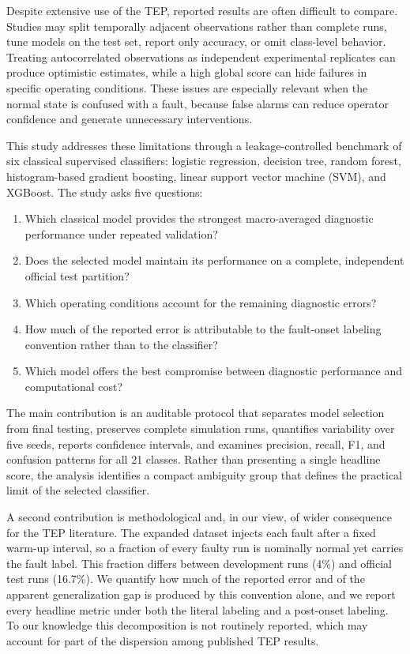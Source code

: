 \documentclass[12pt,a4paper]{article}
\begin{document}
Despite extensive use of the TEP, reported results are often difficult to
compare. Studies may split temporally adjacent observations rather than complete
runs, tune models on the test set, report only accuracy, or omit class-level
behavior. Treating autocorrelated observations as independent experimental
replicates can produce optimistic estimates, while a high global score can hide
failures in specific operating conditions. These issues are especially relevant
when the normal state is confused with a fault, because false alarms can reduce
operator confidence and generate unnecessary interventions.

This study addresses these limitations through a leakage-controlled benchmark
of six classical supervised classifiers: logistic regression, decision tree,
random forest, histogram-based gradient boosting, linear support vector machine
(SVM), and XGBoost. The study asks five questions:

\begin{enumerate}
  \item Which classical model provides the strongest macro-averaged diagnostic
  performance under repeated validation?
  \item Does the selected model maintain its performance on a complete,
  independent official test partition?
  \item Which operating conditions account for the remaining diagnostic errors?
  \item How much of the reported error is attributable to the fault-onset
  labeling convention rather than to the classifier?
  \item Which model offers the best compromise between diagnostic performance
  and computational cost?
\end{enumerate}

The main contribution is an auditable protocol that separates model selection
from final testing, preserves complete simulation runs, quantifies variability
over five seeds, reports confidence intervals, and examines precision, recall,
F1, and confusion patterns for all 21 classes. Rather than presenting a single
headline score, the analysis identifies a compact ambiguity group that defines
the practical limit of the selected classifier.

A second contribution is methodological and, in our view, of wider consequence
for the TEP literature. The expanded dataset injects each fault after a fixed
warm-up interval, so a fraction of every faulty run is nominally normal yet
carries the fault label. This fraction differs between development runs (4\%)
and official test runs (16.7\%). We quantify how much of the reported error and
of the apparent generalization gap is produced by this convention alone, and we
report every headline metric under both the literal labeling and a post-onset
labeling. To our knowledge this decomposition is not routinely reported, which
may account for part of the dispersion among published TEP results.
\end{document}
